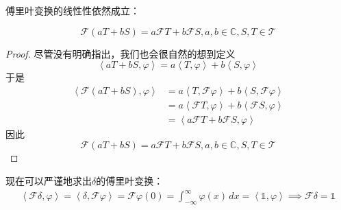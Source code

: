 傅里叶变换的线性性依然成立：
\begin{theorem}[分布的傅里叶变换的线性]
    \[\mathcal{F} (aT+bS)=a\mathcal{F} T+b\mathcal{F} S,a,b\in\mathbb{C},S,T\in\mathcal{T}\]
\end{theorem}
\begin{proof}
    尽管没有明确指出，我们也会很自然的想到定义
\begin{equation}
    \left\langle aT+bS,\varphi\right\rangle=a\left\langle T,\varphi\right\rangle+b\left\langle S,\varphi\right\rangle
\end{equation}
于是\begin{align*}
    \left\langle \mathcal{F} (aT+bS),\varphi\right\rangle & =a\left\langle T,\mathcal{F} \varphi\right\rangle+b\left\langle S,\mathcal{F} \varphi\right\rangle                     \\
                                               & =a\left\langle \mathcal{F} T,\varphi\right\rangle+b\left\langle \mathcal{F} S,\varphi\right\rangle                     \\
                                               & =\left\langle a\mathcal{F} T+b\mathcal{F} S,\varphi\right\rangle
\end{align*}
因此
\[\mathcal{F} (aT+bS)=a\mathcal{F} T+b\mathcal{F} S,a,b\in\mathbb{C},S,T\in\mathcal{T}\]
\end{proof}
\begin{example}
    现在可以严谨地求出$\delta$的傅里叶变换：
\begin{align*}
    \left\langle\mathcal{F}\delta,\varphi\right\rangle=\left\langle \delta,\mathcal{F}\varphi\right\rangle=\mathcal{F}\varphi(0)=\int_{-\infty}^{\infty}\varphi(x)\,dx=\left\langle \mathds{1},\varphi\right\rangle\implies\mathcal{F}\delta=\mathds{1}
\end{align*}
\end{example}
